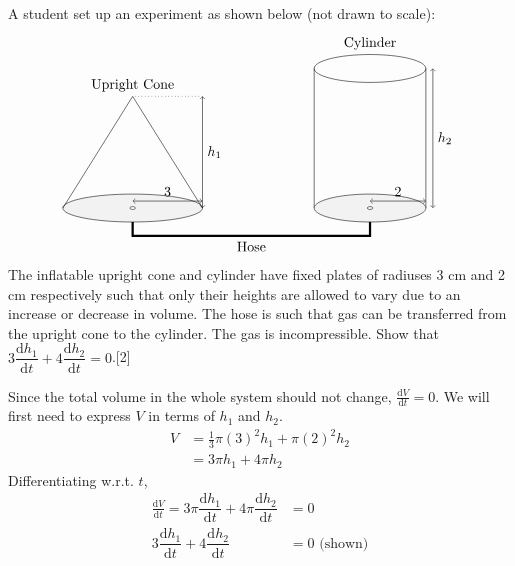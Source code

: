 \documentclass[12pt, a4 paper]{article}
\begin{document}
\begin{outline}[enumerate]
 \1 A student set up an experiment as shown below (not drawn to scale):
 \[
  \begin{tikzpicture}
   \filldraw[color=white!90!gray,draw=black] (0,0) ellipse (50pt and 10pt);
   \draw[<->](0,5pt) -- (25pt,5pt) node[above]{3} --   (50pt,5pt);
   \draw[<->](50pt,0pt) -- (50pt,40pt) node[right]{$h_{1}$} --   (50pt,80pt);
   \draw[dotted](50pt,80pt) -- (0,80pt);
   \draw (-50pt,0) -- (0,80pt) node[above]{Upright Cone} -- (50pt,0);
   \draw (130pt,0) -- (130pt,100pt);
   \draw (210pt,0) -- (210pt,100pt);
   \filldraw[color=white!90!gray,draw=black] (170pt,0) ellipse (40pt and 10pt);
   \draw[<->](170pt,5pt) -- (190pt,5pt) node[above]{2} --   (210pt,5pt);
   \draw[<->](215pt,0pt) -- (215pt,50pt) node[right]{$h_{2}$} --   (215pt,100pt);
   \draw (170pt, 110pt) node[above] {Cylinder};
   \draw (170pt,100pt) ellipse (40pt and 10pt);
   \draw[ultra thick] (0,-10pt) -- (0,-20pt) -- (85pt,-20pt) node[below]{Hose} -- (170pt,-20pt) -- (170pt, -10pt);
   \filldraw[color=white,draw=black] (0,0) ellipse (2pt and 1pt);
   \filldraw[color=white,draw=black] (170pt,0) ellipse (2pt and 1pt);
  \end{tikzpicture}
 \]
 The inflatable upright cone and cylinder have fixed plates of radiuses 3 cm and 2 cm  respectively such that only their heights are allowed to vary due to an increase or decrease in volume. The hose is such that gas can be transferred from the upright cone to the cylinder. The gas is incompressible. %
 \2 Show that $3\dfrac{\mathrm{d}h_{1}}{\mathrm{d}t}+4\dfrac{\mathrm{d}h_{2}}{\mathrm{d}t}=0$.\hfill[2]
 \begin{answer}
  Since the total volume in the whole system should not change, $\frac{\mathrm{d}V}{\mathrm{d}t}=0$. We will first need to express $V$ in terms of $h_{1}$ and $h_{2}$.
  \begin{align*}
    V &= \frac{1}{3}\pi (3)^2 h_{1} + \pi (2)^2 h_{2}\\
    &= 3 \pi h_{1} + 4 \pi h_{2}
  \end{align*}
  Differentiating w.r.t. $t$,
  \begin{align*}
    \frac{\mathrm{d}V}{\mathrm{d}t} = 3 \pi \dfrac{\mathrm{d}h_{1}}{\mathrm{d}t} + 4 \pi \dfrac{\mathrm{d}h_{2}}{\mathrm{d}t} &= 0\\
    3\dfrac{\mathrm{d}h_{1}}{\mathrm{d}t}+4\dfrac{\mathrm{d}h_{2}}{\mathrm{d}t}&=0 \textrm{ (shown)}
  \end{align*}
 \end{answer}


\end{outline}
\end{document}
